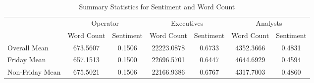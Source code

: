 
\begin{table}[h!]
\centering
\caption{Summary Statistics for Sentiment and Word Count}
\begin{tabular}{lcccccc}
\toprule
 & \multicolumn{2}{c}{Operator} & \multicolumn{2}{c}{Executives} & \multicolumn{2}{c}{Analysts} \\
\cmidrule(lr){2-3} \cmidrule(lr){4-5} \cmidrule(lr){6-7}
 & Word Count & Sentiment & Word Count & Sentiment & Word Count & Sentiment \\
\midrule
Overall Mean & 673.5607 & 0.1506 & 22223.0878 & 0.6733 & 4352.3666 & 0.4831 \\
Friday Mean & 657.1513 & 0.1500 & 22696.5701 & 0.6447 & 4644.6929 & 0.4594 \\
Non-Friday Mean & 675.5021 & 0.1506 & 22166.9386 & 0.6767 & 4317.7003 & 0.4860 \\

\bottomrule
\end{tabular}
\end{table}
